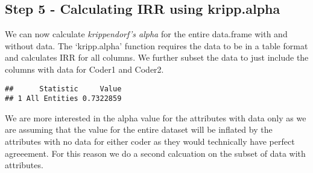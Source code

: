 \documentclass[]{article}
\newenvironment{Shaded}{\begin{snugshade}}{\end{snugshade}}
\newcommand{\KeywordTok}[1]{\textcolor[rgb]{0.13,0.29,0.53}{\textbf{#1}}}
\newcommand{\DataTypeTok}[1]{\textcolor[rgb]{0.13,0.29,0.53}{#1}}
\newcommand{\DecValTok}[1]{\textcolor[rgb]{0.00,0.00,0.81}{#1}}
\newcommand{\StringTok}[1]{\textcolor[rgb]{0.31,0.60,0.02}{#1}}
\newcommand{\OperatorTok}[1]{\textcolor[rgb]{0.81,0.36,0.00}{\textbf{#1}}}
\newcommand{\NormalTok}[1]{#1}
\begin{document}
\subsection{Step 5 - Calculating IRR using
kripp.alpha}\label{step-5---calculating-irr-using-kripp.alpha}

We can now calculate \emph{krippendorf's alpha} for the entire
data.frame with and without data. The `kripp.alpha' function requires
the data to be in a table format and calculates IRR for all columns. We
further subset the data to just include the columns with data for Coder1
and Coder2.

\begin{Shaded}
\end{Shaded}

\begin{verbatim}
##      Statistic     Value
## 1 All Entities 0.7322859
\end{verbatim}

We are more interested in the alpha value for the attributes with data
only as we are assuming that the value for the entire dataset will be
inflated by the attributes with no data for either coder as they would
technically have perfect agreeement. For this reason we do a second
calcuation on the subset of data with attributes.

\begin{Shaded}
\end{Shaded}
\end{document}
